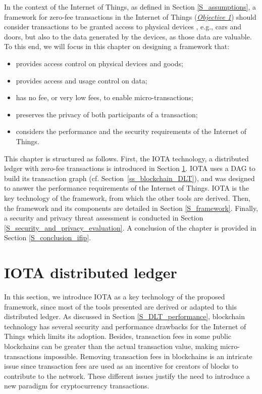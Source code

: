 \minitoc


In the context of the Internet of Things, as defined in Section \ref{S_assumptions}, a framework for zero-fee transactions in the Internet of Things (\hyperref[obj:1]{\emph{Objective 1}}) should consider transactions to be granted access to physical devices
, e.g., cars and doors, but also to the data generated by the devices, as those data are valuable.
To this end, we will focus in this chapter on designing a framework that:

\begin{itemize}
  \item provides access control on physical devices and goods; 
  \item provides access and usage control on data; 
  \item has no fee, or very low fees, to enable micro-transactions;
  \item preserves the privacy of both participants of a transaction;
  \item considers the performance and the security requirements of the Internet of Things.
\end{itemize}

This chapter is structured as follows. First, the IOTA technology, a distributed ledger with zero-fee transactions is introduced in Section \ref{S_iota_dlt}. IOTA uses a DAG to build its transaction graph 
(cf. Section \ref{ss_blockchain_DLT}), and was designed to answer the performance requirements of the Internet of Things. IOTA is the key technology of the 
framework, from which the other tools are derived. Then, the framework and its components are detailed in Section \ref{S_framework}. Finally, a security and privacy threat assessment is conducted in Section \ref{S_security_and_privacy_evaluation}.
A conclusion of the chapter is provided in Section \ref{S_conclusion_ifip}.

\section{IOTA distributed ledger}
\label{S_iota_dlt}
In this section, we introduce IOTA as a key technology of the proposed framework, since most of the tools presented 
are derived or adapted to this distributed ledger.
As discussed in Section \ref{S_DLT_performance}, blockchain technology has several security and performance drawbacks 
for the Internet of Things which limits its 
adoption. Besides, transaction fees in some public blockchains can 
be greater than the actual transaction value, making micro-transactions impossible. Removing transaction fees in blockchains 
is an intricate issue since transaction
fees are used as an incentive for creators of blocks to contribute to the network. These different issues justify the need 
to introduce a new paradigm for 
cryptocurrency transactions. 

